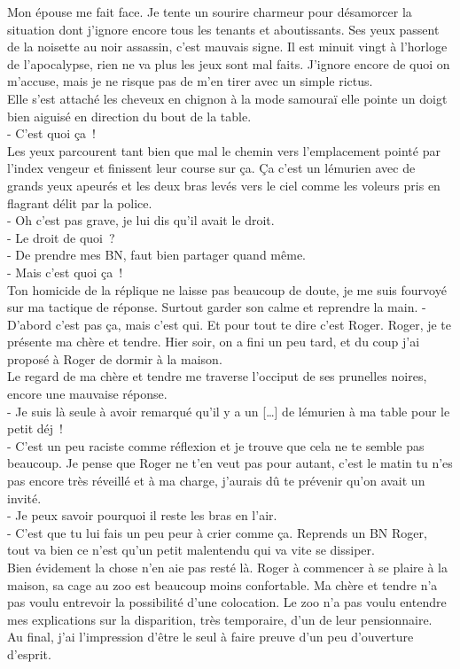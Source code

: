 Mon épouse me fait face. Je tente un sourire charmeur pour désamorcer la situation dont j’ignore encore tous les tenants et aboutissants. Ses yeux passent de la noisette au noir assassin, c’est mauvais signe. Il est minuit vingt à l’horloge de l’apocalypse, rien ne va plus les jeux sont mal faits. J’ignore encore de quoi on m’accuse, mais je ne risque pas de m’en tirer avec un simple rictus.\\
Elle s’est attaché les cheveux en chignon à la mode samouraï elle pointe un doigt bien aiguisé en direction du bout de la table. \\
- C’est quoi ça !\\
Les yeux parcourent tant bien que mal le chemin vers l’emplacement pointé par l’index vengeur et finissent leur course sur ça. Ça c’est un lémurien avec de grands yeux apeurés et les deux bras levés vers le ciel comme les voleurs pris en flagrant délit par la police.\\
- Oh c’est pas grave, je lui dis qu’il avait le droit. \\
- Le droit de quoi ?\\
- De prendre mes BN, faut bien partager quand même. \\
- Mais c’est quoi ça !\\
Ton homicide de la réplique ne laisse pas beaucoup de doute, je me suis fourvoyé sur ma tactique de réponse. Surtout garder son calme et reprendre la main.
- D’abord c’est pas ça, mais c’est qui. Et pour tout te dire c’est Roger. Roger, je te présente ma chère et tendre. Hier soir, on a fini un peu tard, et du coup j’ai proposé à Roger de dormir à la maison.\\
Le regard de ma chère et tendre me traverse l’occiput de ses prunelles noires, encore une mauvaise réponse.\\
- Je suis là seule à avoir remarqué qu’il y a un […] de lémurien à ma table pour le petit déj !\\
- C’est un peu raciste comme réflexion et je trouve que cela ne te semble pas beaucoup. Je pense que Roger ne t’en veut pas pour autant, c’est le matin tu n’es pas encore très réveillé et à ma charge, j’aurais dû te prévenir qu’on avait un invité. \\
- Je peux savoir pourquoi il reste les bras en l’air.\\
- C’est que tu lui fais un peu peur à crier comme ça. Reprends un BN Roger, tout va bien ce n’est qu’un petit malentendu qui va vite se dissiper. \\

Bien évidement la chose n’en aie pas resté là. Roger à commencer à se plaire à la maison, sa cage au zoo est beaucoup moins confortable. Ma chère et tendre n’a pas voulu entrevoir la possibilité d’une colocation. Le zoo n’a pas voulu entendre mes explications sur la disparition, très temporaire, d’un de leur pensionnaire.\\
Au final, j’ai l’impression d’être le seul à faire preuve d’un peu d’ouverture d’esprit.
